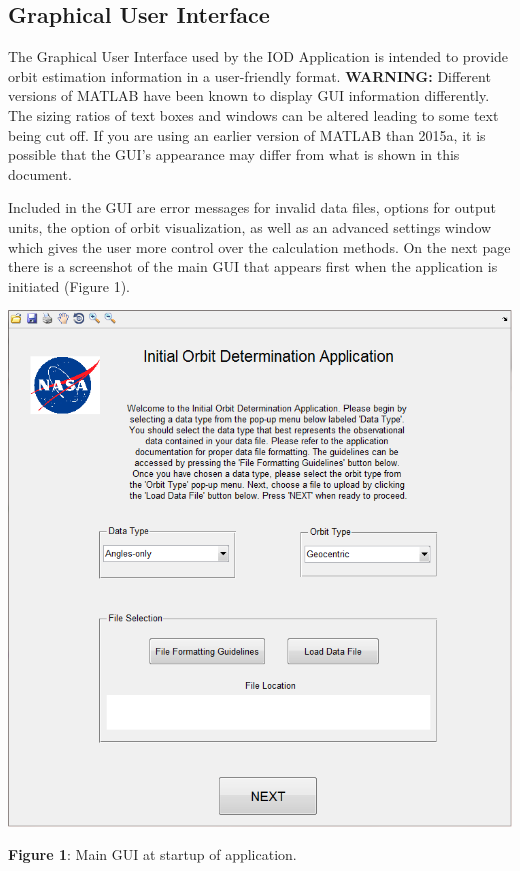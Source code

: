 \documentclass{article}
\begin{document}
      		\subsection{Graphical User Interface}
			\hspace{0.45 cm}The Graphical User Interface used by the IOD Application is intended to provide orbit estimation information in a user-friendly format. \textbf{WARNING:} Different versions of MATLAB have been known to
                                display GUI information differently. The sizing ratios of text boxes and windows can be altered leading to some text being cut off.
			If you are using an earlier version of MATLAB than 2015a, it is possible that the GUI's appearance may differ from what is shown in this document. \par
			Included in the GUI are error messages for invalid data files, options for output units, the option of orbit visualization, as well as an advanced settings window which gives the user more control over the calculation methods. 
			On the next page there is a screenshot of the main GUI that appears first when the application is initiated (Figure 1). 
			\newline\newline
			
			\begin{center}
			\includegraphics[scale=0.69]{ApplicationMainScreenshot.png}
			
	                	\textbf{Figure 1}: Main GUI at startup of application. \newline\par
			\end{center}
\end{document}
